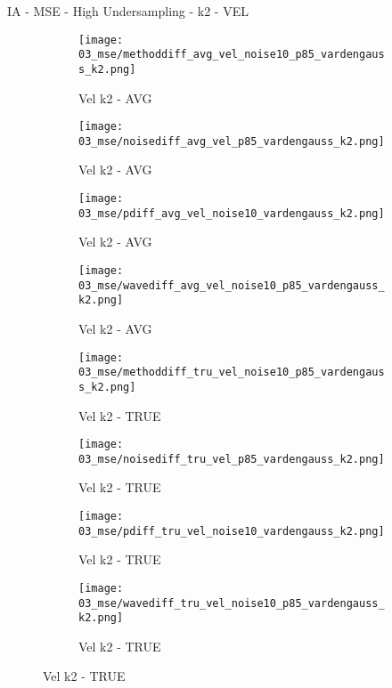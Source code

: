 \documentclass{beamer}
\begin{document}
\begin{frame}{IA - MSE - High Undersampling - k2 - VEL}{}
\begin{figure}
\begin{subfigure}{0.24\textwidth}
\texttt{[image: 03\_mse/methoddiff\_avg\_vel\_noise10\_p85\_vardengauss\_k2.png]}
\vspace{-20pt}
\caption*{\tiny Vel k2 - AVG}
\end{subfigure}
\begin{subfigure}{0.24\textwidth}
\texttt{[image: 03\_mse/noisediff\_avg\_vel\_p85\_vardengauss\_k2.png]}
\vspace{-20pt}
\caption*{\tiny Vel k2 - AVG}
\end{subfigure}
\begin{subfigure}{0.24\textwidth}
\texttt{[image: 03\_mse/pdiff\_avg\_vel\_noise10\_vardengauss\_k2.png]}
\vspace{-20pt}
\caption*{\tiny Vel k2 - AVG}
\end{subfigure}
\begin{subfigure}{0.24\textwidth}
\texttt{[image: 03\_mse/wavediff\_avg\_vel\_noise10\_p85\_vardengauss\_k2.png]}
\vspace{-20pt}
\caption*{\tiny Vel k2 - AVG}
\end{subfigure}

\begin{subfigure}{0.24\textwidth}
\texttt{[image: 03\_mse/methoddiff\_tru\_vel\_noise10\_p85\_vardengauss\_k2.png]}
\vspace{-20pt}
\caption*{\tiny Vel k2 - TRUE}
\end{subfigure}
\begin{subfigure}{0.24\textwidth}
\texttt{[image: 03\_mse/noisediff\_tru\_vel\_p85\_vardengauss\_k2.png]}
\vspace{-20pt}
\caption*{\tiny Vel k2 - TRUE}
\end{subfigure}
\begin{subfigure}{0.24\textwidth}
\texttt{[image: 03\_mse/pdiff\_tru\_vel\_noise10\_vardengauss\_k2.png]}
\vspace{-20pt}
\caption*{\tiny Vel k2 - TRUE}
\end{subfigure}
\begin{subfigure}{0.24\textwidth}
\texttt{[image: 03\_mse/wavediff\_tru\_vel\_noise10\_p85\_vardengauss\_k2.png]}
\vspace{-20pt}
\caption*{\tiny Vel k2 - TRUE}
\end{subfigure}
\end{figure}
\end{frame}
\end{document}
